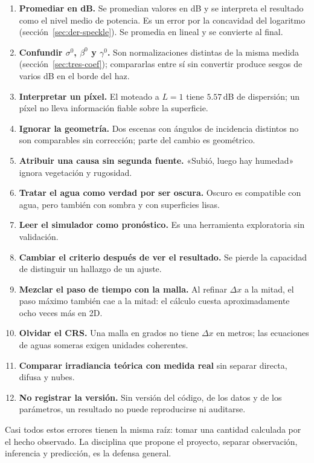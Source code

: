 \documentclass[11pt,a4paper]{article}
\begin{document}
\begin{enumerate}
  \item \textbf{Promediar en dB.} Se promedian valores en dB y se interpreta el resultado como el nivel medio de
        potencia. Es un error por la concavidad del logaritmo (sección~\ref{sec:der-speckle}). Se promedia en
        lineal y se convierte al final.
  \item \textbf{Confundir $\sigma^0$, $\beta^0$ y $\gamma^0$.} Son normalizaciones distintas de la misma
        medida (sección~\ref{sec:tres-coef}); compararlas entre sí sin convertir produce sesgos de varios dB en
        el borde del haz.
  \item \textbf{Interpretar un píxel.} El moteado a $L=1$ tiene $5.57$\,dB de dispersión; un píxel no lleva
        información fiable sobre la superficie.
  \item \textbf{Ignorar la geometría.} Dos escenas con ángulos de incidencia distintos no son comparables sin
        corrección; parte del cambio es geométrico.
  \item \textbf{Atribuir una causa sin segunda fuente.} «Subió, luego hay humedad» ignora vegetación y
        rugosidad.
  \item \textbf{Tratar el agua como verdad por ser oscura.} Oscuro es compatible con agua, pero también con
        sombra y con superficies lisas.
  \item \textbf{Leer el simulador como pronóstico.} Es una herramienta exploratoria sin validación.
  \item \textbf{Cambiar el criterio después de ver el resultado.} Se pierde la capacidad de distinguir un hallazgo
        de un ajuste.
  \item \textbf{Mezclar el paso de tiempo con la malla.} Al refinar $\Delta x$ a la mitad, el paso máximo
        también cae a la mitad: el cálculo cuesta aproximadamente ocho veces más en 2D.
  \item \textbf{Olvidar el CRS.} Una malla en grados no tiene $\Delta x$ en metros; las ecuaciones de aguas
        someras exigen unidades coherentes.
  \item \textbf{Comparar irradiancia teórica con medida real} sin separar directa, difusa y nubes.
  \item \textbf{No registrar la versión.} Sin versión del código, de los datos y de los parámetros, un
        resultado no puede reproducirse ni auditarse.
\end{enumerate}

\begin{intuicion}
Casi todos estos errores tienen la misma raíz: tomar una cantidad calculada por el hecho observado. La
disciplina que propone el proyecto, separar observación, inferencia y predicción, es la defensa general.
\end{intuicion}
\end{document}
